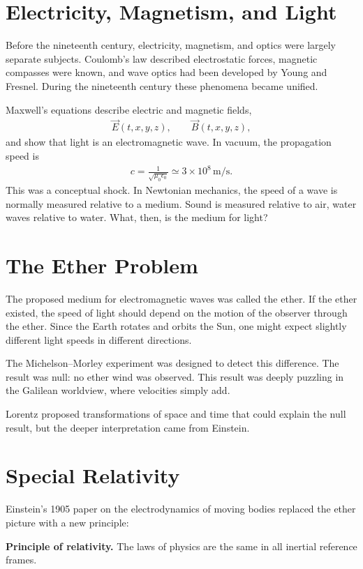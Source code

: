 \documentclass[12pt]{article}
\newcommand{\be}{\begin{eqnarray}}
\newcommand{\ee}{\end{eqnarray}}
\begin{document}
\section{Electricity, Magnetism, and Light}
Before the nineteenth century, electricity, magnetism, and optics were largely separate subjects. Coulomb's law described electrostatic forces, magnetic compasses were known, and wave optics had been developed by Young and Fresnel. During the nineteenth century these phenomena became unified.

Maxwell's equations describe electric and magnetic fields,
\be
\vec{E}(t,x,y,z), \qquad \vec{B}(t,x,y,z),
\ee
and show that light is an electromagnetic wave. In vacuum, the propagation speed is
\be
c = \frac{1}{\sqrt{\mu_0 \epsilon_0}} \simeq 3 \times 10^8\,\mathrm{m/s}.
\ee
This was a conceptual shock. In Newtonian mechanics, the speed of a wave is normally measured relative to a medium. Sound is measured relative to air, water waves relative to water. What, then, is the medium for light?

\section{The Ether Problem}
The proposed medium for electromagnetic waves was called the ether. If the ether existed, the speed of light should depend on the motion of the observer through the ether. Since the Earth rotates and orbits the Sun, one might expect slightly different light speeds in different directions.

The Michelson--Morley experiment was designed to detect this difference. The result was null: no ether wind was observed. This result was deeply puzzling in the Galilean worldview, where velocities simply add.

Lorentz proposed transformations of space and time that could explain the null result, but the deeper interpretation came from Einstein.

\section{Special Relativity}
Einstein's 1905 paper on the electrodynamics of moving bodies replaced the ether picture with a new principle:
\begin{tcolorbox}[colback=blue!5!white]
\textbf{Principle of relativity.} The laws of physics are the same in all inertial reference frames.
\end{tcolorbox}
\end{document}

